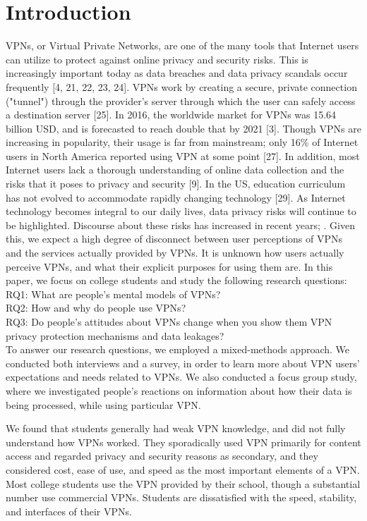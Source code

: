 \section{Introduction}

VPNs, or Virtual
Private Networks, are one of the many tools that Internet users can utilize to
protect against online privacy and security risks. This is increasingly important today as data breaches and data privacy scandals occur frequently [4, 21, 22, 23, 24]. VPNs work by creating a
secure, private connection ("tunnel") through the provider's server through
which the user can safely access a destination server [25].   In 2016, the
worldwide market for VPNs was 15.64 billion USD, and is forecasted to reach
double that by 2021 [3]. Though VPNs are
increasing in popularity, their usage is far from mainstream; only 16\% of
Internet users in North America reported using VPN at some point [27]. In
addition, most Internet users lack a thorough understanding of online data
collection and the risks that it poses to privacy and security [9]. In the US,
education curriculum has not evolved to accommodate rapidly changing
technology [29]. As Internet technology becomes integral to our daily lives, data privacy risks
will continue to be highlighted. Discourse about these risks has increased in
recent years; . Given this, we expect a high degree of disconnect between
user perceptions of VPNs and the services actually provided by VPNs. It is
unknown how users actually perceive VPNs, and what their explicit purposes for
using them are. In this paper, we focus on college students and study the
following research questions:\\
RQ1: What are people’s mental models of VPNs?\\
RQ2: How and why do people use VPNs?\\
RQ3: Do people’s attitudes about VPNs change when you show them VPN privacy protection mechanisms and data leakages?\\

To answer our research questions, we employed a mixed-methods approach. We conducted both interviews and a survey, in order to learn more about VPN users' expectations and needs related to VPNs. We also conducted a focus group study, where we investigated people's reactions on information about how their data is being processed, while using particular VPN.

We found that students generally had weak VPN knowledge, and did not fully
understand how VPNs worked. They sporadically used VPN primarily for content
access and regarded privacy and security reasons as secondary, and they
considered cost, ease of use, and speed as the most important elements of a
VPN. Most college students use the VPN provided by their school, though a
substantial number use commercial VPNs. Students are dissatisfied with the
speed, stability, and interfaces of their VPNs.

